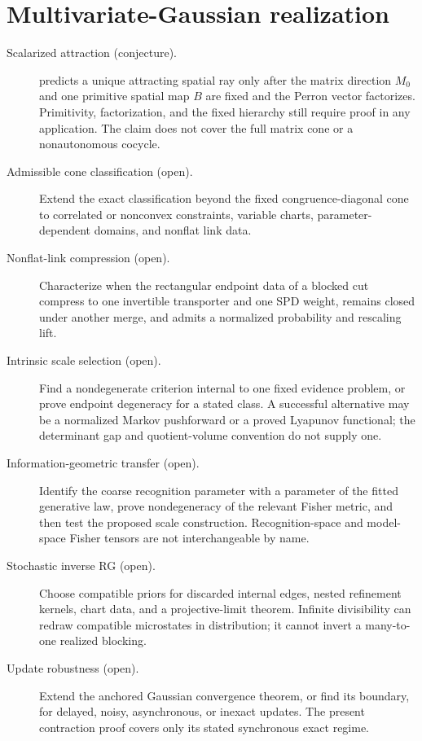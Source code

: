 \section{Multivariate-Gaussian realization}

\begin{description}
\item[Scalarized attraction (conjecture).]
 predicts a unique attracting spatial ray
only after the matrix direction \(M_0\) and one primitive spatial map \(B\)
are fixed and the Perron vector factorizes.  Primitivity, factorization, and
the fixed hierarchy still require proof in any application.  The claim does
not cover the full matrix cone or a nonautonomous cocycle.

\item[Admissible cone classification (open).]
Extend the exact classification beyond the fixed
congruence-diagonal cone to correlated or nonconvex constraints, variable
charts, parameter-dependent domains, and nonflat link data. 

\item[Nonflat-link compression (open).]
Characterize when the rectangular endpoint data of a blocked cut
compress to one invertible transporter and one SPD weight, remains closed
under another merge, and admits a normalized probability and rescaling lift.

\item[Intrinsic scale selection (open).]
Find a nondegenerate criterion internal to one fixed evidence problem, or
prove endpoint degeneracy for a stated class.  A successful alternative may
be a normalized Markov pushforward or a proved Lyapunov functional; the
determinant gap and quotient-volume convention do not supply one. 

\item[Information-geometric transfer (open).]
Identify the coarse recognition parameter with a parameter of the fitted
generative law, prove nondegeneracy of the relevant Fisher metric, and then
test the proposed scale construction.  Recognition-space and model-space
Fisher tensors are not interchangeable by name. 

\item[Stochastic inverse RG (open).]
Choose compatible priors for discarded internal edges, nested refinement
kernels, chart data, and a projective-limit theorem.  Infinite divisibility
can redraw compatible microstates in distribution; it cannot invert a
many-to-one realized blocking. 

\item[Update robustness (open).]
Extend the anchored Gaussian convergence theorem, or find its boundary, for
delayed, noisy, asynchronous, or inexact updates.  The present contraction
proof covers only its stated synchronous exact regime. 
\end{description}


